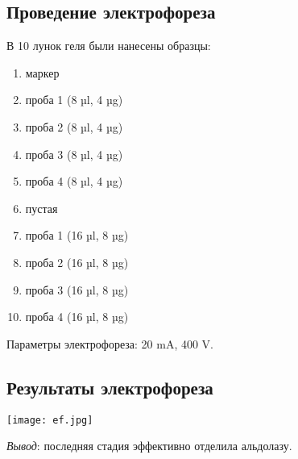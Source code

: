 \subsection{Проведение электрофореза}
В 10 лунок геля были нанесены образцы:
\begin{enumerate}
\item маркер
\item проба 1 (8 µl, 4 µg)
\item проба 2 (8 µl, 4 µg)
\item проба 3 (8 µl, 4 µg)
\item проба 4 (8 µl, 4 µg)
\item пустая
\item проба 1 (16 µl, 8 µg)
\item проба 2 (16 µl, 8 µg)
\item проба 3 (16 µl, 8 µg)
\item проба 4 (16 µl, 8 µg)
\end{enumerate}

Параметры электрофореза: 20 mA, 400 V.

\subsection{Результаты электрофореза}
\texttt{[image: ef.jpg]}

\emph{Вывод}: последняя стадия эффективно отделила альдолазу.

